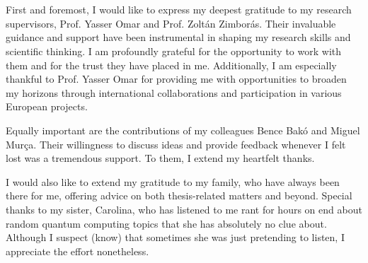 
\section*{\acknowledgments}\label{sec:acknowledgments}



First and foremost, I would like to express my deepest gratitude to my research supervisors, Prof. Yasser Omar and Prof. Zoltán Zimborás. Their invaluable guidance and support have been instrumental in shaping my research skills and scientific thinking. I am profoundly grateful for the opportunity to work with them and for the trust they have placed in me. Additionally, I am especially thankful to Prof. Yasser Omar for providing me with opportunities to broaden my horizons through international collaborations and participation in various European projects.

Equally important are the contributions of my colleagues Bence Bakó and Miguel Murça. Their willingness to discuss ideas and provide feedback whenever I felt lost was a tremendous support. To them, I extend my heartfelt thanks.

I would also like to extend my gratitude to my family, who have always been there for me, offering advice on both thesis-related matters and beyond.  Special thanks to my sister, Carolina, who has listened to me rant for hours on end about random quantum computing topics that she has absolutely no clue about. Although I suspect (know) that sometimes she was just pretending to listen, I appreciate the effort nonetheless.

